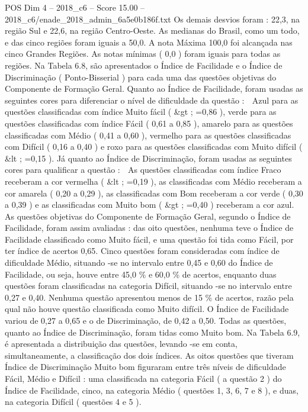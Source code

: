 \begin{textsample}{POS Dim 4 – 2018\_c6 – Score 15.00 – 2018\_c6/enade\_2018\_admin\_6a5e0b186f.txt}
Os demais desvios foram : 22,3, na região Sul e 22,6, na região Centro-Oeste.
As medianas do Brasil, como um todo, e das cinco regiões foram iguais a 50,0.
A nota Máxima 100,0 foi alcançada nas cinco Grandes Regiões.
As notas mínimas ( 0,0 ) foram iguais para todas as regiões.
Na Tabela 6.8, são apresentados o Índice de Facilidade e o Índice de Discriminação ( Ponto-Bisserial ) para cada uma das questões objetivas do Componente de Formação Geral.
Quanto ao Índice de Facilidade, foram usadas as seguintes cores para diferenciar o nível de dificuldade da questão :  Azul para as questões classificadas com índice Muito fácil ( \&gt ; =0,86 ), verde para as questões classificadas com índice Fácil ( 0,61 a 0,85 ), amarelo para as questões classificadas com Médio ( 0,41 a 0,60 ), vermelho para as questões classificadas com Difícil ( 0,16 a 0,40 ) e roxo para as questões classificadas com Muito difícil ( \&lt ; =0,15 ).
Já quanto ao Índice de Discriminação, foram usadas as seguintes cores para qualificar a questão :  As questões classificadas com índice Fraco receberam a cor vermelha ( \&lt ; =0,19 ), as classificadas com Médio receberam a cor amarela ( 0,20 a 0,29 ), as classificadas com Bom receberam a cor verde ( 0,30 a 0,39 ) e as classificadas com Muito bom ( \&gt ; =0,40 ) receberam a cor azul.
As questões objetivas do Componente de Formação Geral, segundo o Índice de Facilidade, foram assim avaliadas : das oito questões, nenhuma teve o Índice de Facilidade classificado como Muito fácil, e uma questão foi tida como Fácil, por ter índice de acertos 0,65.
Cinco questões foram consideradas com índice de dificuldade Médio, situando -se no intervalo entre 0,45 e 0,60 do Índice de Facilidade, ou seja, houve entre 45,0 \% e 60,0 \% de acertos, enquanto duas questões foram classificadas na categoria Difícil, situando -se no intervalo entre 0,27 e 0,40.
Nenhuma questão apresentou menos de 15 \% de acertos, razão pela qual não houve questão classificada como Muito difícil.
O Índice de Facilidade variou de 0,27 a 0,65 e o de Discriminação, de 0,42 a 0,50.
Todas as questões, quanto ao Índice de Discriminação, foram tidas como Muito bom.
Na Tabela 6.9, é apresentada a distribuição das questões, levando -se em conta, simultaneamente, a classificação dos dois índices.
As oitos questões que tiveram Índice de Discriminação Muito bom figuraram entre três níveis de dificuldade Fácil, Médio e Difícil : uma classificada na categoria Fácil ( a questão 2 ) do Índice de Facilidade, cinco, na categoria Médio ( questões 1, 3, 6, 7 e 8 ), e duas, na categoria Difícil ( questões 4 e 5 ).

\end{textsample}

